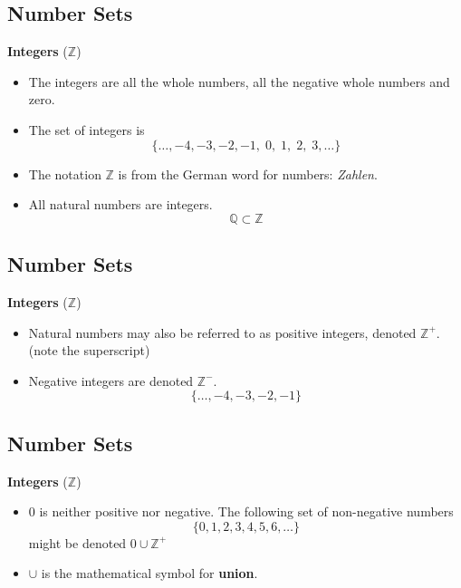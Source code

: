 \documentclass[11pt,a4paper,titlepage,oneside,openany]{article}
\numberwithin{equation}{section}
\numberwithin{algorithm}{section}
\numberwithin{figure}{section}
\numberwithin{table}{section}
\begin{document}
{%


\subsection{Number Sets}


\textbf{Integers} ($\mathbb{Z}$)
\begin{itemize}
\item The integers are all the whole numbers, all the negative whole numbers and zero.

\item The set of integers is 
\[\{\ldots,-4,-3,-2,-1,\;0,\;1,\;2,\;3,\ldots\} \]
\item The notation $\mathbb{Z}$ is from the German word for numbers: \textit{Zahlen}. 
\item All natural numbers are integers.
\[ \mathbb{Q}  \subset \mathbb{Z}\]
\end{itemize}



\subsection{Number Sets}

\textbf{Integers} ($\mathbb{Z}$)
\begin{itemize}
\item Natural numbers may also be referred to as positive integers, denoted $\mathbb{Z}^{+}$. \\(note the superscript)
\item Negative integers are denoted $\mathbb{Z}^{-}$.
\[\{\ldots,-4,-3,-2,-1\}\]
\end{itemize}



\subsection{Number Sets}

\textbf{Integers} ($\mathbb{Z}$)
\begin{itemize}
\item 0 is neither positive nor negative. The following set of non-negative numbers \[\{0,1,2,3,4,5,6,\ldots\} \] might be denoted $0 \cup \mathbb{Z}^{+}$
\item $\cup$ is the mathematical symbol for \textbf{union}.
\end{itemize}



}
\end{document}
